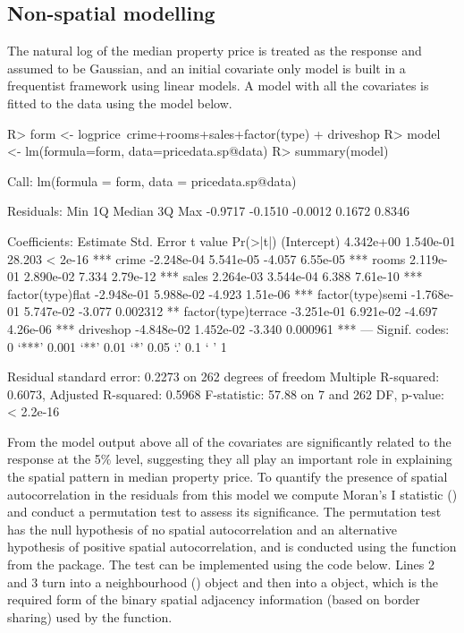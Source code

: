\documentclass[article,shortnames,nojss]{jss}
\begin{document}
\subsection{Non-spatial modelling}
The natural log of the median property price is treated as the response and assumed to be Gaussian, and an initial covariate only model is built in a frequentist framework using linear models. A model with all the covariates is fitted to the data using the model below.
    
\begin{Schunk}
\begin{Sinput}
R> form <- logprice~crime+rooms+sales+factor(type) + driveshop
R> model <- lm(formula=form, data=pricedata.sp@data)
R> summary(model)
\end{Sinput}
\begin{Soutput}
Call:
lm(formula = form, data = pricedata.sp@data)

Residuals:
    Min      1Q  Median      3Q     Max 
-0.9717 -0.1510 -0.0012  0.1672  0.8346 

Coefficients:
                      Estimate Std. Error t value Pr(>|t|)    
(Intercept)          4.342e+00  1.540e-01  28.203  < 2e-16 ***
crime               -2.248e-04  5.541e-05  -4.057 6.55e-05 ***
rooms                2.119e-01  2.890e-02   7.334 2.79e-12 ***
sales                2.264e-03  3.544e-04   6.388 7.61e-10 ***
factor(type)flat    -2.948e-01  5.988e-02  -4.923 1.51e-06 ***
factor(type)semi    -1.768e-01  5.747e-02  -3.077 0.002312 ** 
factor(type)terrace -3.251e-01  6.921e-02  -4.697 4.26e-06 ***
driveshop           -4.848e-02  1.452e-02  -3.340 0.000961 ***
---
Signif. codes:  0 ‘***’ 0.001 ‘**’ 0.01 ‘*’ 0.05 ‘.’ 0.1 ‘ ’ 1

Residual standard error: 0.2273 on 262 degrees of freedom
Multiple R-squared:  0.6073,	Adjusted R-squared:  0.5968 
F-statistic: 57.88 on 7 and 262 DF,  p-value: < 2.2e-16
\end{Soutput}
\end{Schunk}
    
From the model output above all of the covariates are significantly related to the response at the 5$\%$ level, suggesting they all play an important role in explaining the spatial pattern in median property price. To quantify the presence of spatial autocorrelation in the residuals from this model we compute Moran's I statistic (\citealp{moran1950}) and conduct a permutation test to assess its significance. The permutation test has the null hypothesis of no spatial autocorrelation and an alternative hypothesis of positive spatial autocorrelation, and is conducted using the  function from the  package. The test can be implemented using the code below. Lines 2 and 3 turn  into a neighbourhood () object and then into a  object, which is the required form of the binary spatial adjacency information (based on border sharing) used by the  function.
\end{document}
